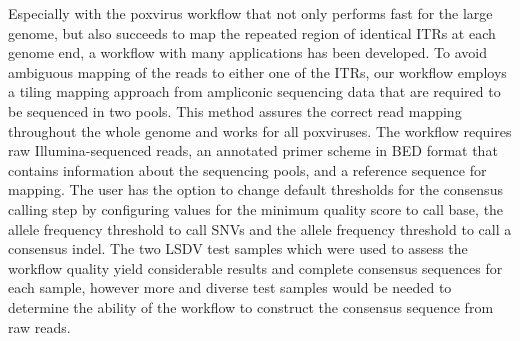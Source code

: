 Especially with the poxvirus workflow that not only performs fast for the large genome, but also succeeds to map the repeated region of identical \acp{ITR} at each genome end, a workflow with many applications has been developed. To avoid ambiguous mapping of the reads to either one of the \acp{ITR}, our workflow employs a tiling mapping approach from ampliconic sequencing data that are required to be sequenced in two pools. This method assures the correct read mapping throughout the whole genome and works for all poxviruses. The workflow requires raw Illumina-sequenced reads, an annotated primer scheme in \ac{BED} format that contains information about the sequencing pools, and a reference sequence for mapping. The user has the option to change default thresholds for the consensus calling step by configuring values for the minimum quality score to call base, the allele frequency threshold to call \acp{SNV} and the allele frequency threshold to call a consensus indel. The two \ac{LSDV} test samples which were used to assess the workflow quality yield considerable results and complete consensus sequences for each sample, however more and diverse test samples would be needed to determine the ability of the workflow to construct the consensus sequence from raw reads. \\
